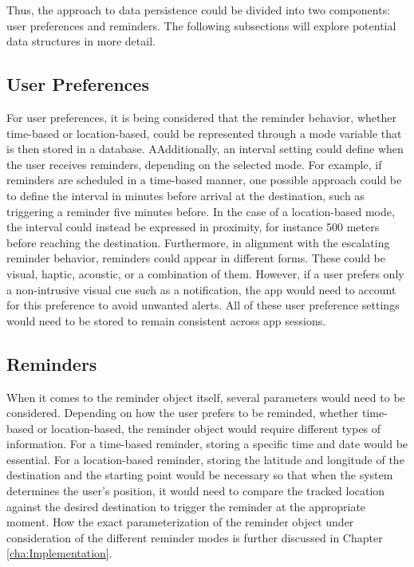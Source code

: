 Thus, the approach to data persistence could be divided into two components: user preferences and reminders.
The following subsections will explore potential data structures in more detail.

\subsection{User Preferences}
For user preferences, it is being considered that the reminder behavior, whether time-based or location-based, could be represented through a mode variable that is then stored in a database.
AAdditionally, an interval setting could define when the user receives reminders, depending on the selected mode. 
For example, if reminders are scheduled in a time-based manner, one possible approach could be to define the interval in minutes before arrival at the destination, such as triggering a reminder five minutes before.
In the case of a location-based mode, the interval could instead be expressed in proximity, for instance 500 meters before reaching the destination.
Furthermore, in alignment with the escalating reminder behavior, reminders could appear in different forms. 
These could be visual, haptic, acoustic, or a combination of them. 
However, if a user prefers only a non-intrusive visual cue such as a notification, the app would need to account for this preference to avoid unwanted alerts.
All of these user preference settings would need to be stored to remain consistent across app sessions.

\subsection{Reminders}
When it comes to the reminder object itself, several parameters would need to be considered.
Depending on how the user prefers to be reminded, whether time-based or location-based, the reminder object would require different types of information.
For a time-based reminder, storing a specific time and date would be essential.
For a location-based reminder, storing the latitude and longitude of the destination and the starting point would be necessary so that when the system determines the user's position, it would need to compare the tracked location against the desired destination to trigger the reminder at the appropriate moment.
How the exact parameterization of the reminder object under consideration of the different reminder modes is further discussed in Chapter \ref{cha:Implementation}.


